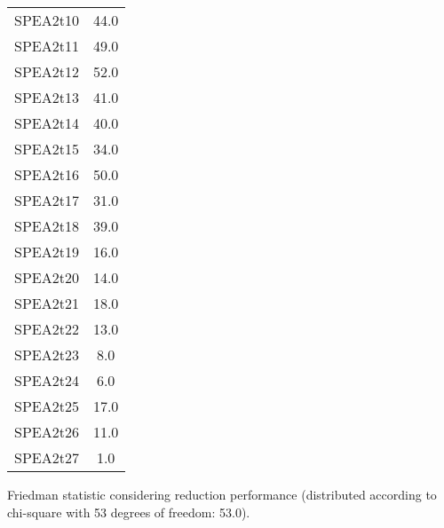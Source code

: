 \documentclass{article}
\begin{document}
\begin{table}[!htp]
\begin{tabular}{c|c}
SPEA2t10&44.0\\
SPEA2t11&49.0\\
SPEA2t12&52.0\\
SPEA2t13&41.0\\
SPEA2t14&40.0\\
SPEA2t15&34.0\\
SPEA2t16&50.0\\
SPEA2t17&31.0\\
SPEA2t18&39.0\\
SPEA2t19&16.0\\
SPEA2t20&14.0\\
SPEA2t21&18.0\\
SPEA2t22&13.0\\
SPEA2t23&8.0\\
SPEA2t24&6.0\\
SPEA2t25&17.0\\
SPEA2t26&11.0\\
SPEA2t27&1.0\\
\end{tabular}
\end{table}


Friedman statistic considering reduction performance (distributed according to chi-square with 53 degrees of freedom: 53.0).
\end{document}
